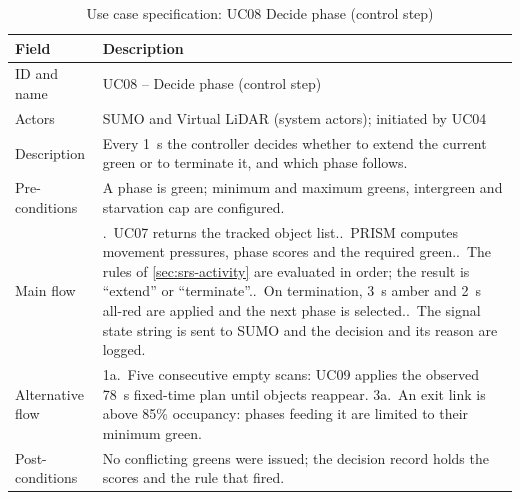 \begin{table}[htbp]
\centering
\caption{Use case specification: UC08 Decide phase (control step)}
\label{tab:srs-uc-decide}
\small
\renewcommand{\arraystretch}{1.15}
\begin{tabularx}{\textwidth}{@{}>{\raggedright\arraybackslash}p{2.8cm}>{\raggedright\arraybackslash}X@{}}
\toprule
\textbf{Field} & \textbf{Description}\\
\midrule
ID and name & UC08 -- Decide phase (control step)\\
Actors & SUMO and Virtual LiDAR (system actors); initiated by UC04\\
Description & Every 1~s the controller decides whether to extend the current green or to terminate it, and which phase follows.\\
Pre-conditions & A phase is green; minimum and maximum greens, intergreen and starvation cap are configured.\\
Main flow & 1.~UC07 returns the tracked object list.\newline
2.~PRISM computes movement pressures, phase scores and the required green.\newline
3.~The rules of \cref{sec:srs-activity} are evaluated in order; the result is ``extend'' or ``terminate''.\newline
4.~On termination, 3~s amber and 2~s all-red are applied and the next phase is selected.\newline
5.~The signal state string is sent to SUMO and the decision and its reason are logged.\\
Alternative flow & 1a.~Five consecutive empty scans: UC09 applies the observed 78~s fixed-time plan until objects reappear.\newline
3a.~An exit link is above 85\% occupancy: phases feeding it are limited to their minimum green.\\
Post-conditions & No conflicting greens were issued; the decision record holds the scores and the rule that fired.\\
\bottomrule
\end{tabularx}
\end{table}

